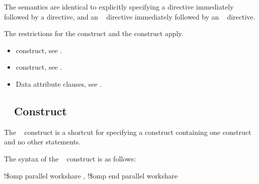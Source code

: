 {{{{\fortranspecificstart
The semantics are identical to explicitly specifying a  directive immediately 
followed by a  directive, and an ~ directive immediately 
followed by an ~ directive. 
\fortranspecificend

\restrictions
The restrictions for the  construct and the  construct apply.

\crossreferences
\begin{itemize}
\item {} construct, see 
. 

\item {} construct, see 
.

\item Data attribute clauses, see 
.
\end{itemize}









\vspace{3\baselineskip}
\fortranspecificstart
\vspace{-3\baselineskip}
\subsection{~ Construct}
\label{subsec:parallel workshare Construct}
\summary
The ~ construct is a shortcut for specifying a  
construct containing one  construct and no other statements.

\syntax
The syntax of the ~ construct is as follows:

\begin{boxedcode}
!\$omp parallel workshare \plc{[clause[ [},\plc{] clause] ... ]}
!\$omp end parallel workshare
\end{boxedcode}

}}}}

